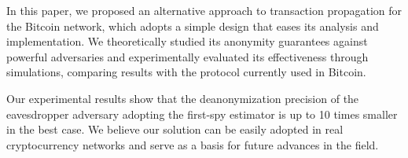 \documentclass{article}
\begin{document}
	In this paper, we proposed an alternative approach to transaction propagation for the Bitcoin network, which adopts a simple design that eases its analysis and implementation.
	We theoretically studied its anonymity guarantees against powerful adversaries and experimentally evaluated its effectiveness through simulations, comparing results with the protocol currently used in Bitcoin.
	
	Our experimental results show that the deanonymization precision of the eavesdropper adversary adopting the first-spy estimator is up to 10 times smaller in the best case.
	We believe our solution can be easily adopted in real cryptocurrency networks and serve as a basis for future advances in the field.

	\printbibliography
\end{document}
